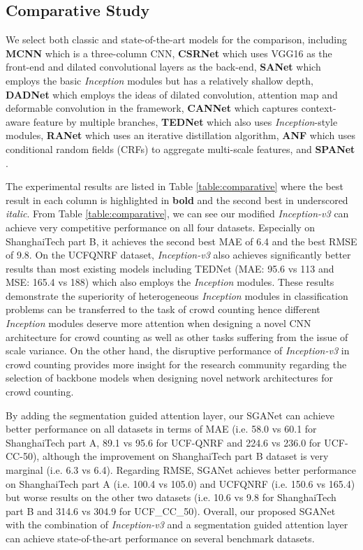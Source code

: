 \documentclass[journal,comsoc]{IEEEtran}
\begin{document}
\subsection{Comparative Study} \label{sec:comparative}
We select both classic and state-of-the-art models for the comparison, including \textbf{MCNN} \cite{zhang2016single} which is a three-column CNN, \textbf{CSRNet} \cite{li2018csrnet} which uses VGG16 as the front-end and dilated convolutional layers as the back-end, \textbf{SANet} \cite{cao2018scale} which employs the basic \textit{Inception} modules but has a relatively shallow depth, \textbf{DADNet} \cite{guo2019dadnet} which employs the ideas of dilated convolution, attention map and deformable convolution in the framework, \textbf{CANNet} \cite{liu2019context} which captures context-aware feature by multiple branches, \textbf{TEDNet} \cite{jiang2019crowd} which also uses \textit{Inception}-style modules, \textbf{RANet} \cite{zhang2019relational} which uses an iterative distillation algorithm, \textbf{ANF} \cite{zhang2019attentional} which uses conditional random fields (CRFs) to aggregate multi-scale features, and \textbf{SPANet} \cite{cheng2019learning}.  



The experimental results are listed in Table \ref{table:comparative} where the best result in each column is highlighted in \textbf{bold} and the second best in underscored \textit{italic}. From Table \ref{table:comparative}, we can see our modified \textit{Inception-v3} can achieve very competitive performance on all four datasets. Especially on ShanghaiTech part B, it achieves the second best MAE of 6.4 and the best RMSE of 9.8. On the UCFQNRF dataset, \textit{Inception-v3} also achieves significantly better results than 
most existing models including TEDNet (MAE: 95.6 vs 113 and MSE: 165.4 vs 188) which also employs the \textit{Inception} modules. These results demonstrate the superiority of heterogeneous \textit{Inception} modules in classification problems can be transferred to the task of crowd counting hence different \textit{Inception} modules deserve more attention when designing a novel CNN architecture for crowd counting as well as other tasks suffering from the issue of scale variance. On the other hand, the disruptive performance of \textit{Inception-v3} in crowd counting provides more insight for the research community regarding the selection of backbone models when designing novel network architectures for crowd counting.

By adding the segmentation guided attention layer, our SGANet can achieve better performance on all datasets in terms of MAE (i.e. 58.0 vs 60.1 for ShanghaiTech part A, 89.1 vs 95.6 for UCF-QNRF and 224.6 vs 236.0 for UCF-CC-50), although the improvement on ShanghaiTech part B dataset is very marginal (i.e. 6.3 vs 6.4). Regarding RMSE, SGANet achieves better performance on ShanghaiTech part A (i.e. 100.4 vs 105.0) and UCFQNRF (i.e. 150.6 vs 165.4) but worse results on the other two datasets (i.e. 10.6 vs 9.8 for ShanghaiTech part B and 314.6 vs 304.9 for UCF\_CC\_50). Overall, our proposed SGANet with the combination of \textit{Inception-v3} and a segmentation guided attention layer can achieve state-of-the-art performance on several benchmark datasets.
\end{document}
